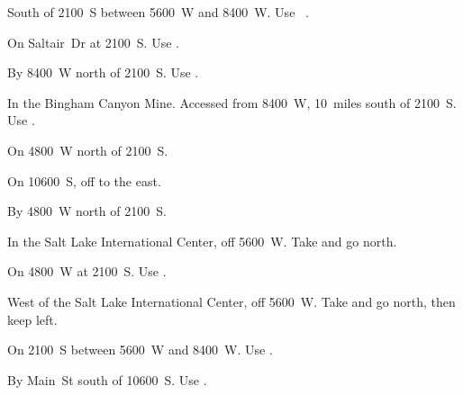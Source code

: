 
\begin{LocationList}

South of  2100~S between  5600~W and 8400~W.
Use~ .

On  Saltair~Dr at  2100~S.
Use  .

By 8400~W north of  2100~S.
Use  .

In the Bingham Canyon Mine.
Accessed from 8400~W, 10~miles south of  2100~S.
Use  .

\Location{\GarageHQ \Garage}
On 4800~W north of  2100~S.

On 10600~S, off   to the east.

\Location{\RecruitmentAgency \Recruitment}
By 4800~W north of  2100~S.

In the Salt Lake International Center, off 5600~W.
Take   and go north.

\Location{\TruckStop \Gas \Rest \Weigh}
On 4800~W at  2100~S.
Use  .

West of the Salt Lake International Center, off 5600~W.
Take   and go north, then keep left.

On  2100~S between  5600~W and 8400~W.
Use  .

By Main~St south of  10600~S.
Use  .

\end{LocationList}
